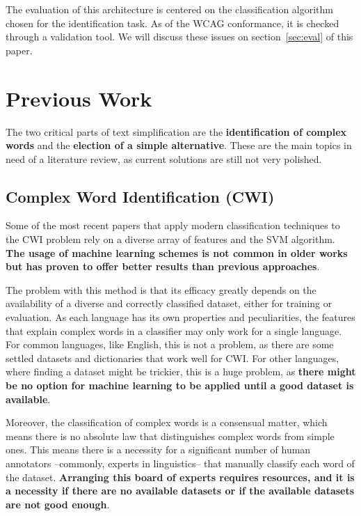 \documentclass[11pt,a4paper]{article}
\begin{document}
The evaluation of this architecture is centered on the classification algorithm chosen for the identification task. As of the WCAG conformance, it is checked through a validation tool. We will discuss these issues on section~\ref{sec:eval} of this paper.

\section{Previous Work}

The two critical parts of text simplification are the \textbf{identification of complex words} and the \textbf{election of a simple alternative}. These are the main topics in need of a literature review, as current solutions are still not very polished.

\subsection{Complex Word Identification (CWI)}

Some of the most recent papers that apply modern classification techniques to the CWI problem rely on a diverse array of features and the SVM algorithm. \textbf{The usage of machine learning schemes is not common in older works but has proven to offer better results than previous approaches}.

The problem with this method is that its efficacy greatly depends on the availability of a diverse and correctly classified dataset, either for training or evaluation. As each language has its own properties and peculiarities, the features that explain complex words in a classifier may only work for a single language. For common languages, like English, this is not a problem, as there are some settled datasets and dictionaries that work well for CWI. For other languages, where finding a dataset might be trickier, this is a huge problem, as \textbf{there might be no option for machine learning to be applied until a good dataset is available}.

Moreover, the classification of complex words is a consensual matter, which means there is no absolute law that distinguishes complex words from simple ones. This means there is a necessity for a significant number of human annotators –commonly, experts in linguistics– that manually classify each word of the dataset. \textbf{Arranging this board of experts requires resources, and it is a necessity if there are no available datasets or if the available datasets are not good enough}.
\end{document}
